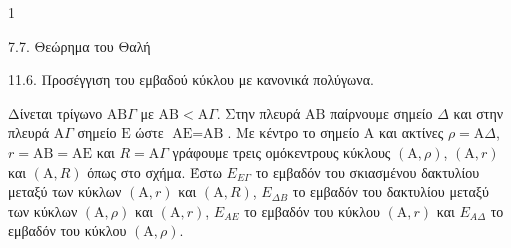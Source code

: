 \begin{ylh}{1}
    \item 7.7. Θεώρημα του Θαλή
    \item 11.6. Προσέγγιση του εμβαδού κύκλου με κανονικά πολύγωνα.
\end{ylh}
\begin{figure}
\end{figure}
Δίνεται τρίγωνο $\text{AB}\Gamma$ με $\text{AB} < \text{A}\Gamma$. Στην πλευρά $\text{AB}$ παίρνουμε σημείο $\Delta$ και στην πλευρά $\text{A}\Gamma$ σημείο $\text{E}$ ώστε $\text{AE} = \text{AB}$. Με κέντρο το σημείο $\text{A}$ και ακτίνες $\rho = \text{A}\Delta$, $r = \text{AB} = \text{AE}$ και $R = \text{A}\Gamma$ γράφουμε τρεις ομόκεντρους κύκλους $(\text{A}, \rho)$, $(\text{A}, r)$ και $(\text{A}, R)$ όπως στο σχήμα. Έστω $E_{E\Gamma}$ το εμβαδόν του σκιασμένου δακτυλίου μεταξύ των κύκλων $(\text{A}, r)$ και $(\text{A}, R)$, $E_{\Delta B}$ το εμβαδόν του δακτυλίου μεταξύ των κύκλων $(\text{A}, \rho)$ και $(\text{A}, r)$, $E_{AE}$ το εμβαδόν του κύκλου $(\text{A}, r)$ και $E_{A\Delta}$ το εμβαδόν του κύκλου $(\text{A}, \rho)$.

